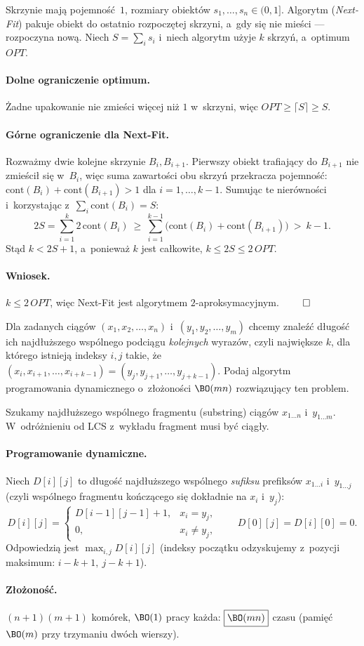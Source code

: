 Skrzynie mają pojemność~$1$, rozmiary obiektów $s_1,\dots,s_n\in(0,1]$. Algorytm
(\emph{Next-Fit}) pakuje obiekt do ostatnio rozpoczętej skrzyni, a~gdy się nie
mieści --- rozpoczyna nową. Niech $S=\sum_i s_i$ i~niech algorytm użyje $k$
skrzyń, a~optimum $OPT$.

\paragraph{Dolne ograniczenie optimum.}
Żadne upakowanie nie zmieści więcej niż $1$ w~skrzyni, więc
$OPT\geq\lceil S\rceil\geq S$.

\paragraph{Górne ograniczenie dla Next-Fit.}
Rozważmy dwie kolejne skrzynie $B_i,B_{i+1}$. Pierwszy obiekt trafiający do
$B_{i+1}$ nie zmieścił się w~$B_i$, więc suma zawartości obu skrzyń przekracza
pojemność: $\mathrm{cont}(B_i)+\mathrm{cont}(B_{i+1})>1$ dla $i=1,\dots,k-1$.
Sumując te nierówności i~korzystając z~$\sum_i\mathrm{cont}(B_i)=S$:
\[
	2S=\sum_{i=1}^{k}2\,\mathrm{cont}(B_i)
	\ \geq\ \sum_{i=1}^{k-1}\big(\mathrm{cont}(B_i)+\mathrm{cont}(B_{i+1})\big)
	\ >\ k-1.
\]
Stąd $k<2S+1$, a~ponieważ $k$ jest całkowite, $k\leq 2S\leq 2\,OPT$.

\paragraph{Wniosek.}
$k\leq 2\,OPT$, więc Next-Fit jest algorytmem $2$-aproksymacyjnym. $\qed$

\clearpage
\begin{zadanie}
	Dla zadanych ciągów $(x_1,x_2,\dots,x_n)$ i~$(y_1,y_2,\dots,y_m)$ chcemy
	znaleźć długość ich najdłuższego wspólnego podciągu \emph{kolejnych} wyrazów,
	czyli największe $k$, dla którego istnieją indeksy $i,j$ takie, że
	$(x_i,x_{i+1},\dots,x_{i+k-1})=(y_j,y_{j+1},\dots,y_{j+k-1})$. Podaj algorytm
	programowania dynamicznego o~złożoności $\BO(mn)$ rozwiązujący ten problem.
\end{zadanie}

Szukamy najdłuższego wspólnego  fragmentu (substring) ciągów
$x_{1\ldots n}$ i~$y_{1\ldots m}$. W~odróżnieniu od LCS z~wykładu fragment musi
być ciągły.

\paragraph{Programowanie dynamiczne.}
Niech $D[i][j]$ to długość najdłuższego wspólnego \emph{sufiksu} prefiksów
$x_{1\ldots i}$ i~$y_{1\ldots j}$ (czyli wspólnego fragmentu kończącego się
dokładnie na $x_i$ i~$y_j$):
\[
	D[i][j]=
	\begin{cases}
		D[i-1][j-1]+1, & x_i=y_j,\\
		0,             & x_i\neq y_j,
	\end{cases}
	\qquad D[0][j]=D[i][0]=0.
\]
Odpowiedzią jest $\max_{i,j} D[i][j]$ (indeksy początku odzyskujemy z~pozycji
maksimum: $i-k+1,\ j-k+1$).

\paragraph{Złożoność.}
$(n+1)(m+1)$ komórek, $\BO(1)$ pracy każda: $\boxed{\BO(mn)}$ czasu
(pamięć $\BO(m)$ przy trzymaniu dwóch wierszy).
